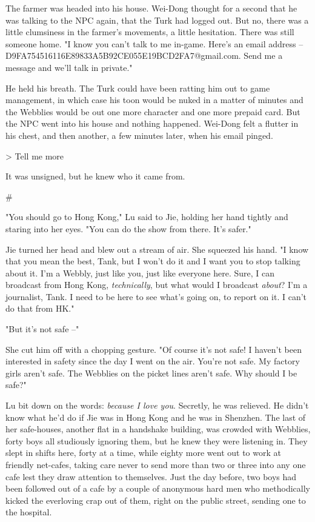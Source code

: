 The farmer was headed into his house. Wei-Dong thought for a second
that he was talking to the NPC again, that the Turk had logged out.
But no, there was a little clumsiness in the farmer's movements, a
little hesitation. There was still someone home. "I know you can't
talk to me in-game. Here's an email address --
D9FA754516116E89833A5B92CE055E19BCD2FA7@gmail.com. Send me a
message and we'll talk in private."

He held his breath. The Turk could have been ratting him out to
game management, in which case his toon would be nuked in a matter
of minutes and the Webblies would be out one more character and one
more prepaid card. But the NPC went into his house and nothing
happened. Wei-Dong felt a flutter in his chest, and then another, a
few minutes later, when his email pinged.

\textgreater{} Tell me more

It was unsigned, but he knew who it came from.

\#

"You should go to Hong Kong," Lu said to Jie, holding her hand
tightly and staring into her eyes. "You can do the show from there.
It's safer."

Jie turned her head and blew out a stream of air. She squeezed his
hand. "I know that you mean the best, Tank, but I won't do it and I
want you to stop talking about it. I'm a Webbly, just like you,
just like everyone here. Sure, I can broadcast from Hong Kong,
\emph{technically}, but what would I broadcast \emph{about}? I'm a
journalist, Tank. I need to be here to see what's going on, to
report on it. I can't do that from HK."

"But it's not safe --"

She cut him off with a chopping gesture. "Of course it's not safe!
I haven't been interested in safety since the day I went on the
air. You're not safe. My factory girls aren't safe. The Webblies on
the picket lines aren't safe. Why should I be safe?"

Lu bit down on the words: \emph{because I love you}. Secretly, he
was relieved. He didn't know what he'd do if Jie was in Hong Kong
and he was in Shenzhen. The last of her safe-houses, another flat
in a handshake building, was crowded with Webblies, forty boys all
studiously ignoring them, but he knew they were listening in. They
slept in shifts here, forty at a time, while eighty more went out
to work at friendly net-cafes, taking care never to send more than
two or three into any one cafe lest they draw attention to
themselves. Just the day before, two boys had been followed out of
a cafe by a couple of anonymous hard men who methodically kicked
the everloving crap out of them, right on the public street,
sending one to the hospital.

